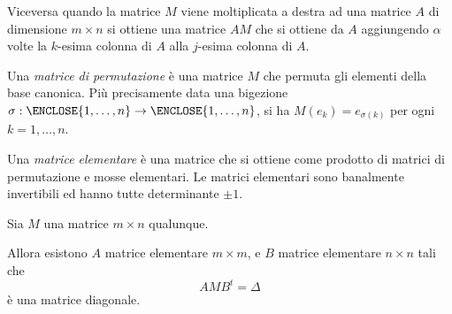 \begin{definition}
Viceversa quando la matrice $M$ viene moltiplicata a destra ad una matrice $A$ di dimensione $m\times n$
si ottiene una matrice $A M$ che si ottiene da $A$ aggiungendo $\alpha$ volte la $k$-esima colonna di $A$
alla $j$-esima colonna di $A$.

Una \emph{matrice di permutazione} è una matrice $M$ che permuta gli elementi 
della base canonica. 
Più precisamente data una bigezione $\sigma: \ENCLOSE{1,\ldots,n} \to \ENCLOSE{1,\ldots,n}$, 
si ha $M(e_k) = e_{\sigma(k)}$ per ogni $k=1,\ldots,n$.

Una \emph{matrice elementare} è una matrice che si ottiene come prodotto di matrici di permutazione e mosse elementari.
Le matrici elementari sono banalmente invertibili 
ed hanno tutte determinante $\pm 1$.
\end{definition}

\begin{theorem}
\label{th:riduzione_gauss}
Sia $M$ una matrice $m\times n$ qualunque. 

Allora esistono $A$ matrice elementare $m\times m$,
e $B$ matrice elementare $n\times n$ tali che
\[
  A M B^t = \Delta
\]
è una matrice diagonale.
\end{theorem}

